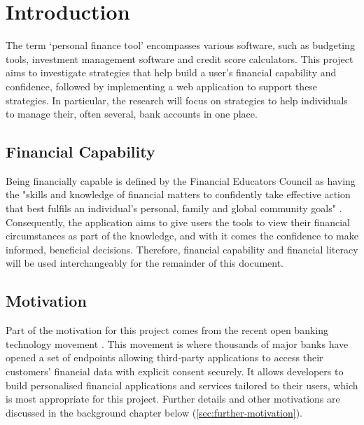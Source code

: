 \chapter{Introduction}
\label{ch:introduction}

The term `personal finance tool' encompasses various software, such as budgeting tools, investment management software and credit score calculators. This project aims to investigate strategies that help build a user's financial capability and confidence, followed by implementing a web application to support these strategies. In particular, the research will focus on strategies to help individuals to manage their, often several, bank accounts in one place.

\section{Financial Capability}
Being financially capable is defined by the Financial Educators Council as having the "skills and knowledge of financial matters to confidently take effective action that best fulfils an individual's personal, family and global community goals" \cite{FinancialEducatorsCouncil}. Consequently, the application aims to give users the tools to view their financial circumstances as part of the knowledge, and with it comes the confidence to make informed, beneficial decisions. Therefore, financial capability and financial literacy will be used interchangeably for the remainder of this document.

\section{Motivation}
Part of the motivation for this project comes from the recent open banking technology movement \cite{OpenBanking}. This movement is where thousands of major banks have opened a set of endpoints allowing third-party applications to access their customers' financial data with explicit consent securely. It allows developers to build personalised financial applications and services tailored to their users, which is most appropriate for this project. Further details and other motivations are discussed in the background chapter below (\ref{sec:further-motivation}).
